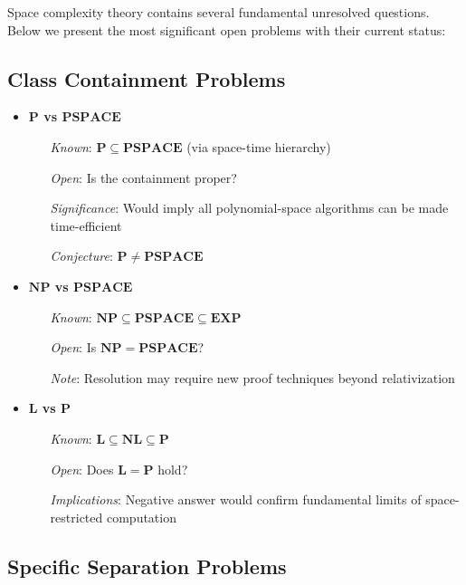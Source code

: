 Space complexity theory contains several fundamental unresolved questions. Below we present the most significant open problems with their current status:

\subsection{Class Containment Problems}

\begin{itemize}
    \item \textbf{$\mathbf{P}$ vs $\mathbf{PSPACE}$}
    \begin{itemize}
        \item[\textit{Known}:] $\mathbf{P} \subseteq \mathbf{PSPACE}$ (via space-time hierarchy)
        \item[\textit{Open}:] Is the containment proper?
        \item[\textit{Significance}:] Would imply all polynomial-space algorithms can be made time-efficient
        \item[\textit{Conjecture}:] $\mathbf{P} \neq \mathbf{PSPACE}$
    \end{itemize}

    \item \textbf{$\mathbf{NP}$ vs $\mathbf{PSPACE}$}
    \begin{itemize}
        \item[\textit{Known}:] $\mathbf{NP} \subseteq \mathbf{PSPACE} \subseteq \mathbf{EXP}$
        \item[\textit{Open}:] Is $\mathbf{NP} = \mathbf{PSPACE}$?
        \item[\textit{Note}:] Resolution may require new proof techniques beyond relativization
    \end{itemize}

    \item \textbf{$\mathbf{L}$ vs $\mathbf{P}$}
    \begin{itemize}
        \item[\textit{Known}:] $\mathbf{L} \subseteq \mathbf{NL} \subseteq \mathbf{P}$
        \item[\textit{Open}:] Does $\mathbf{L} = \mathbf{P}$ hold?
        \item[\textit{Implications}:] Negative answer would confirm fundamental limits of space-restricted computation
    \end{itemize}
\end{itemize}

\subsection{Specific Separation Problems}


